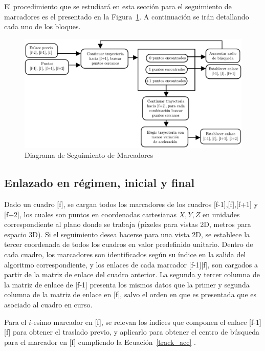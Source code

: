 El procedimiento que se estudiará en esta sección para el seguimiento de marcadores es el presentado en la Figura~\ref{diagrama_seguimiento}. A continuación se irán detallando cada uno de los bloques. 
\begin{figure}[ht!]
\hspace{-1cm}
\includegraphics[scale=0.71]{img/Tracking/diagrama_seguimiento}
\caption{Diagrama de Seguimiento de Marcadores}
\label{diagrama_seguimiento}
\end{figure}


\subsection{Enlazado en régimen, inicial y final}

Dado un cuadro [f], se cargan todos los marcadores de los cuadros [f-1],[f],[f+1] y [f+2], los cuales son puntos en coordenadas cartesianas $X,Y,Z$ en unidades correspondiente al plano donde se trabaja (píxeles para vistas 2D, metros para espacio 3D). Si el seguimiento desea hacerse para una vista 2D, se establece la tercer coordenada de todos los cuadros en valor predefinido unitario. Dentro de cada cuadro, los marcadores son identificados según su índice en la salida del algoritmo correspondiente, y los enlaces de cada marcador [f-1][f], son cargados a partir de la matriz de enlace del cuadro anterior. La segunda y tercer columna de la matriz de enlace de [f-1] presenta los mismos datos que la primer y segunda columna de la matriz de enlace en [f], salvo el orden en que es presentada que es asociado al cuadro en curso.

Para el $i$-esimo marcador en [f], se relevan los índices que componen el enlace [f-1][f] para obtener el traslado previo, y aplicarlo para obtener el centro de búsqueda para el marcador en [f] cumpliendo la Ecuación~\ref{track_acc} .

